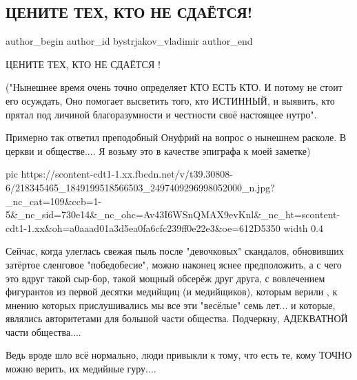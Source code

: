  
 
 
 
 
 
\subsection{ЦЕНИТЕ ТЕХ, КТО НЕ СДАЁТСЯ!}
\label{sec:21_07_2021.fb.bystrjakov_vladimir.1.cenite_teh_kto_ne_sdajetsja}
 
\ifcmt
 author_begin
   author_id bystrjakov_vladimir
 author_end
\fi

ЦЕНИТЕ ТЕХ, КТО НЕ СДАЁТСЯ !

("Нынешнее время очень точно определяет КТО ЕСТЬ КТО. И потому не стоит его
осуждать, Оно помогает высветить того, кто ИСТИННЫЙ, и выявить, кто прятал под
личиной благоразумности и честности своё настоящее нутро". 

Примерно так ответил преподобный Онуфрий на вопрос о нынешнем расколе.  В
церкви и обществе.... Я возьму это в качестве эпиграфа к моей заметке)

\ifcmt
  pic https://scontent-cdt1-1.xx.fbcdn.net/v/t39.30808-6/218345465_1849199518566503_2497409296998052000_n.jpg?_nc_cat=109&ccb=1-5&_nc_sid=730e14&_nc_ohc=Av43I6WSnQMAX9evKnl&_nc_ht=scontent-cdt1-1.xx&oh=a0aaad01a3d5ea0fa6cfc239ff0e22e3&oe=612D5350
  width 0.4
\fi

Сейчас, когда улеглась свежая пыль после "девочковых" скандалов, обновивших
затёртое сленговое "победобесие", можно наконец яснее предположить, а с чего
это вдруг такой сыр-бор, такой мощный обсерёж друг друга, с вовлечением
фигурантов из первой десятки медийщиц (и медийщиков), которым верили , к мнению
которых прислушивались мы все эти "весёлые" семь лет... и которые, являлись
авторитетами для большой части общества. Подчеркну, АДЕКВАТНОЙ части
общества.... 

Ведь вроде шло всё нормально, люди привыкли к тому, что есть те, кому ТОЧНО
можно верить, их медийные гуру.... 


